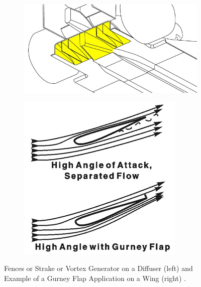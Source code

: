 \begin{figure}[!ht]
\begin{center}
%    
  \begin{subfigure}[b]{0.4\textwidth}
    \includegraphics[scale=0.45]{Figures/diffuser_fences.jpg}
  \end{subfigure}
  \begin{subfigure}[b]{0.4\textwidth}
    \includegraphics[scale=0.6]{Figures/Gurney.jpg}
  \end{subfigure}
%  
  \caption{Fences or Strake or Vortex Generator on a Diffuser (left) and Example of a Gurney Flap Application on a Wing (right) \cite{Anonymous2020GurneyFlap}.}
    \label{fig:gurney}
\end{center}
\end{figure}